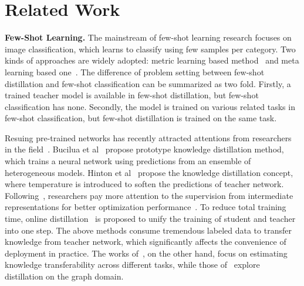 \documentclass[letterpaper]{article} %
\begin{document}
\section{Related Work}
{
    {\bf Few-Shot Learning. } 
    The mainstream of few-shot learning research focuses on image classification, which learns to classify using few samples per category. 
    Two kinds of approaches are widely adopted: metric learning based method~\cite{koch2015siamese,vinyals2016matching,NIPS2017_6996} and meta learning based one~\cite{ravi2017optimization,wang2016learning,santoro2016one}. 
    The difference of problem setting between few-shot distillation and few-shot classification can be summarized as two fold.
    Firstly, a trained teacher model is available in few-shot distillation, but few-shot classification has none.
    Secondly, the model is trained on various related tasks in few-shot classification, but few-shot distillation is trained on the same task.


    Resuing pre-trained networks has recently attracted attentions from researchers in the field~\cite{Chen_2020_CVPR,Yu_2017_CVPR}.
    Bucilua et al~\cite{bucilua2006model} propose prototype knowledge distillation method, which trains a neural network using 
    predictions from an ensemble of heterogeneous models. 
    Hinton et al~\cite{hinton2015distilling} propose the knowledge distillation concept, where temperature is introduced to soften the predictions of teacher network. 
    Following~\cite{hinton2015distilling}, researchers pay more attention to the supervision from intermediate representations for better optimization performance~\cite{romero2015fitnets,Wang2018ProgressiveBK,shen2019amalgamating,shen2019customizing,ye2020data,luo2020collaboration}. 
    To reduce total training time, online distillation~\cite{yang2019snapshot,zhang2019your} is proposed to unify the training of student and teacher into one step. 
    The above methods consume tremendous labeled data to transfer 
    knowledge from teacher network, which significantly affects 
    the convenience of deployment in practice.
    The works of~\cite{Song_2019_NeurIPS,Song_2020_CVPR},
    on the other hand, focus on 
    estimating knowledge transferability 
    across different tasks, while
    those of~\cite{Yang_2020_CVPR,Yang_2020_NIPS}
    explore distillation on the graph domain.

}
\end{document}
